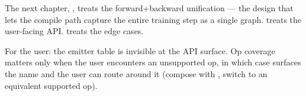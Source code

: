 The next chapter, , treats the
forward+backward unification --- the design that lets the compile
path capture the entire training step as a single graph.
 treats the user-facing API.
 treats the edge cases.

\begin{lucidnote}
For the user: the emitter table is invisible at the API surface.
Op coverage matters only when the user encounters an unsupported
op, in which case  surfaces the name and the
user can route around it (compose with , switch to
an equivalent supported op).
\end{lucidnote}
